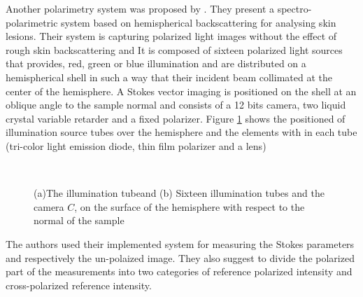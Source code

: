 \documentclass[oneside,a4,12p]{report} %
\begin{document}
Another polarimetry system was proposed by \cite{boulbry2006novel}. They present a spectro-polarimetric system based on hemispherical backscattering for analysing skin lesions. Their system is capturing polarized light images without the effect of rough skin backscattering and It is composed of sixteen polarized light sources that provides, red, green or blue illumination and are distributed on a hemispherical shell in such a way that their incident beam collimated at the center of the hemisphere. 
A Stokes vector imaging is positioned on the shell at an oblique angle to the sample normal and consists of a 12 bits camera, two liquid crystal variable retarder and a fixed polarizer. Figure \ref{fig:SVhemisphere} shows the positioned of illumination source tubes over the hemisphere and the elements with in each tube (tri-color light emission diode, thin film polarizer and a lens)

	\begin{figure}
	\ \hfil
	\caption{(a)The illumination tubeand (b) Sixteen illumination tubes and the camera $C$, on the surface of the hemisphere with respect to the normal of the sample} 			 			    
	\label{fig:SVhemisphere}
	\end{figure}

The authors used their implemented system for measuring the Stokes parameters and respectively the un-polaized image. They also suggest to divide the polarized part of the measurements into two categories of reference polarized intensity and cross-polarized reference intensity.  
\end{document}
